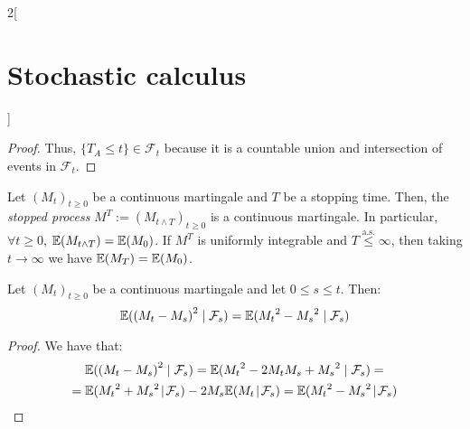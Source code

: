 \documentclass[../../../main_math.tex]{subfiles}
\begin{document}
\begin{multicols}{2}[\section{Stochastic calculus}]
\begin{proof}
    Thus, $\{T_A \leq t\}\in \mathcal{F}_t$ because it is a countable union and intersection of events in $\mathcal{F}_t$.
  \end{proof}
  \begin{theorem}\label{SC:doob_sampling}
    Let ${(M_t)}_{t\geq 0}$ be a continuous martingale and $T$ be a stopping time. Then, the \emph{stopped process} $M^T:={(M_{t\wedge T})}_{t\geq 0}$ is a continuous martingale. In particular, $\forall t\geq 0$, $\mathbb{E}(M_{t\wedge T})=\mathbb{E}(M_0)$. If $M^T$ is uniformly integrable and $T\overset{\text{a.s.}}{\leq}\infty$, then taking $t\to\infty$ we have $\mathbb{E}(M_T)=\mathbb{E}(M_0)$.
  \end{theorem}
  \begin{lemma}\label{SC:orthogonality_martingales}
    Let ${(M_t)}_{t\geq 0}$ be a continuous martingale and let $0\leq s\leq t$. Then:
    $$
      \mathbb{E}({(M_t-M_s)}^2\mid \mathcal{F}_s)=\mathbb{E}({M_t}^2-{M_s}^2\mid \mathcal{F}_s)
    $$
  \end{lemma}
  \begin{proof}
    We have that:
    \begin{multline*}
      \mathbb{E}({(M_t-M_s)}^2\mid \mathcal{F}_s) =\mathbb{E}({M_t}^2-2M_tM_s+{M_s}^2\mid \mathcal{F}_s) =\\=\mathbb{E}({M_t}^2+{M_s}^2\!\mid \!\mathcal{F}_s)-2M_s\mathbb{E}(M_t\!\mid\! \mathcal{F}_s) =\mathbb{E}({M_t}^2-{M_s}^2\!\mid\! \mathcal{F}_s)
    \end{multline*}
  \end{proof}

\end{multicols}
\end{document}
